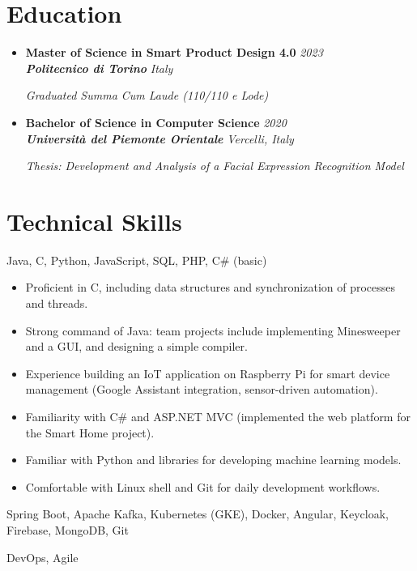 \documentclass[a4paper,10pt]{article}
\newenvironment{entrylist}{
    \begin{itemize}[leftmargin=*, label={}, noitemsep, topsep=0pt]
}{
    \end{itemize}
}
\newcommand{\entry}[4]{
    \item
    \textbf{#1} \hfill \textit{#2} \\
    \textbf{\textit{#3}} \hfill \textit{#4}
}
\begin{document}
\section*{Education}
\begin{entrylist}
    \entry{Master of Science in Smart Product Design 4.0}{2023}{Politecnico di Torino}{Italy}
    \textit{Graduated Summa Cum Laude (110/110 e Lode)}

    \entry{Bachelor of Science in Computer Science}{2020}{Università del Piemonte Orientale}{Vercelli, Italy}
    \textit{Thesis: Development and Analysis of a Facial Expression Recognition Model}
\end{entrylist}

\section*{Technical Skills}
\begin{description}[style=multiline, labelwidth=3.5cm, leftmargin=!, noitemsep]
    \item[Programming Languages] Java, C, Python, JavaScript, SQL, PHP, C# (basic)
    \item[Skills & Highlights]
    \begin{itemize}[leftmargin=1.5em, noitemsep]
        \item Proficient in C, including data structures and synchronization of processes and threads.
        \item Strong command of Java: team projects include implementing Minesweeper and a GUI, and designing a simple compiler.
        \item Experience building an IoT application on Raspberry Pi for smart device management (Google Assistant integration, sensor-driven automation).
        \item Familiarity with C# and ASP.NET MVC (implemented the web platform for the Smart Home project).
        \item Familiar with Python and libraries for developing machine learning models.
        \item Comfortable with Linux shell and Git for daily development workflows.
    \end{itemize}
    \item[Frameworks \& Tools] Spring Boot, Apache Kafka, Kubernetes (GKE), Docker, Angular, Keycloak, Firebase, MongoDB, Git
    \item[Methodologies] DevOps, Agile
\end{description}
\end{document}
